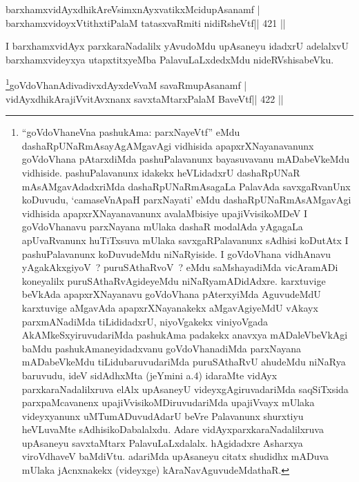 
\begin{shl}
barxhamxvidAyxdhikAreV\s simxnAyxvatikxMcidupAsanamf |
barxhamxvidoyxVtithxtiPalaM tatasxvaRmiti nidiRsheVtf\hfill || 421 ||
\end{shl}

\begin{artha}
I barxhamxvidAyx parxkaraNadalilx yAvudoMdu upAsaneyu idadxrU adelalxvU barxhamxvideyxya utapxtitxyeMba PalavuLaLxdedxMdu nideRVshisabeVku.
\end{artha}



\begin{shl}
\footnote{``goVdoVhaneVna pashukAma: parxNayeVtf'' eMdu   dashaRpUNaRmAsayAgAMgavAgi vidhisida apapxrXNayanavanunx   goVdoVhana pAtarxdiMda pashuPalavanunx bayasuvavanu mADabeVkeMdu   vidhiside. pashuPalavanunx idakekx heVLidadxrU dashaRpUNaR   mAsAMgavAdadxriMda dashaRpUNaRmAsagaLa PalavAda savxgaRvanUnx   koDuvudu, `camaseVnApaH parxNayati' eMdu dashaRpUNaRmAsAMgavAgi   vidhisida apapxrXNayanavanunx avalaMbisiye upajiVvisikoMDeV I   goVdoVhanavu parxNayana mUlaka dashaR modalAda yAgagaLa apUvaRvanunx   huTiTxsuva mUlaka savxgaRPalavanunx sAdhisi koDutAtx I   pashuPalavanunx koDuvudeMdu niNaRyiside. I goVdoVhana vidhAnavu   yAgakAkxgiyoV~? puruSAthaRvoV~? eMdu saMshayadiMda vicAramADi   koneyalilx puruSAthaRvAgideyeMdu niNaRyamADidAdxre. karxtuvige   beVkAda apapxrXNayanavu goVdoVhana pAterxyiMda AguvudeMdU karxtuvige   aMgavAda apapxrXNayanakekx aMgavAgiyeMdU vAkayx parxmANadiMda   tiLididadxrU, niyoVgakekx viniyoVgada AkAMkeSxyiruvudariMda   pashukAma padakekx anavxya mADaleVbeVkAgi baMdu   pashukAmaneyidadxvanu goVdoVhanadiMda parxNayana mADabeVkeMdu   tiLidubaruvudariMda puruSAthaRvU ahudeMdu niNaRya baruvudu,   ideV sidAdhxMta (jeYmini a.4) idaraMte vidAyx parxkaraNadalilxruva   elAlx upAsaneyU videyxgAgiruvadariMda saqSiTxsida parxpaMcavanenx   upajiVvisikoMDiruvudariMda upajiVvayx mUlaka videyxyanunx   uMTumADuvudAdarU beVre Palavanunx shurxtiyu heVLuvaMte   sAdhisikoDabalalxdu. Adare vidAyxparxkaraNadalilxruva upAsaneyu   savxtaMtarx PalavuLaLxdalalx. hAgidadxre Asharxya   viroVdhaveV baMdiVtu. adariMda upAsaneyu citatx shudidhx   mADuva mUlaka jAcnxnakekx (videyxge) kAraNavAguvudeMdathaR.}goVdoVhanAdivadivxdAyxdeVvaM savaRmupAsanamf |
vidAyxdhikArajiVvitAvxnanx savxtaMtarxPalaM BaveVtf\hfill || 422 ||
\end{shl}

